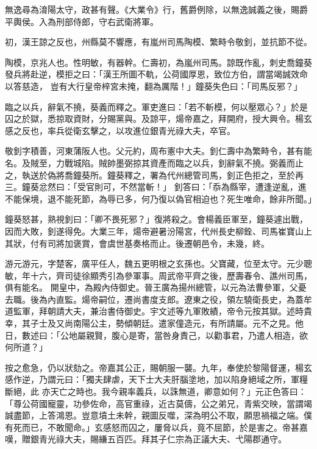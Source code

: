 \begin{pinyinscope}
 無逸尋為淯陽太守，政甚有聲。《大業令》行，舊爵例除，以無逸誠義之後，賜爵平輿侯。入為刑部侍郎，守右武衛將軍。



 初，漢王諒之反也，州縣莫不響應，有嵐州司馬陶模、繁畤令敬釗，並抗節不從。



 陶模，京兆人也。性明敏，有器幹。仁壽初，為嵐州司馬。諒既作亂，刺史喬鐘葵發兵將赴逆，模拒之曰：「漢王所圖不軌，公荷國厚恩，致位方伯，謂當竭誠效命以答慈造，
 豈有大行皇帝梓宮未掩，翻為厲階！」鐘葵失色曰：「司馬反邪？」



 臨之以兵，辭氣不撓，葵義而釋之。軍吏進曰：「若不斬模，何以壓眾心？」於是囚之於獄，悉掠取資財，分賜黨與。及諒平，煬帝嘉之，拜開府，授大興令。楊玄感之反也，率兵從衛玄擊之，以攻進位銀青光祿大夫，卒官。



 敬釗字積善，河東蒲阪人也。父元約，周布憲中大夫。釗仁壽中為繁畤令，甚有能名。及賊至，力戰城陷。賊帥墨弼掠其資產而臨之以兵，釗辭氣不撓。弼義而止之，執送於偽將喬鐘葵所。鐘葵釋之，署為代州總管司馬，釗正色拒之，至於再三。鐘葵忿然曰：「受官則可，不然當斬！」
 釗答曰：「忝為縣宰，遭逢逆亂，進不能保境，退不能死節，為辱已多，何乃復以偽官相迫也？死生唯命，餘非所聞。」



 鐘葵怒甚，熟視釗曰：「卿不畏死邪？」復將殺之。會楊義臣軍至，鐘葵遽出戰，因而大敗，釗遂得免。大業三年，煬帝避暑汾陽宮，代州長史柳銓、司馬崔寶山上其狀，付有司將加褒賞，會虞世基奏格而止。後遷朝邑令，未幾，終。



 游元游元，字楚客，廣平任人，魏五更明根之玄孫也。父寶藏，位至太守。元少聰敏，年十六，齊司徒徐顯秀引為參軍事。周武帝平齊之後，歷壽春令、譙州司馬，俱有能名。
 開皇中，為殿內侍御史。晉王廣為揚州總管，以元為法曹參軍，父憂去職。後為內直監。煬帝嗣位，遷尚書度支郎。遼東之役，領左驍衛長史，為蓋牟道監軍，拜朝請大夫，兼治書侍御史。宇文述等九軍敗績，帝令元按其獄。述時貴幸，其子士及又尚南陽公主，勢傾朝廷。遣家僮造元，有所請屬。元不之見。他日，數述曰：「公地屬親賢，腹心是寄，當咎身責己，以勸事君，乃遣人相造，欲何所道？」



 按之愈急，仍以狀劾之。帝嘉其公正，賜朝服一襲。九年，奉使於黎陽督運，楊玄感作逆，乃謂元曰：「獨夫肆虐，天下士大夫肝腦塗地，加以陷身絕域之所，軍糧斷絕，此
 亦天亡之時也。我今親率義兵，以誅無道，卿意如何？」元正色答曰：「尊公荷國寵靈，功參佐命，高官重祿，近古莫儔，公之弟兄，青紫交映，當謂竭誠盡節，上答鴻恩。豈意墳土未幹，親圖反噬，深為明公不取，願思禍福之端。僕有死而已，不敢聞命。」玄感怒而囚之，屢脅以兵，竟不屈節，於是害之。帝甚嘉嘆，贈銀青光祿大夫，賜縑五百匹。拜其子仁宗為正議大夫、弋陽郡通守。




\end{pinyinscope}
